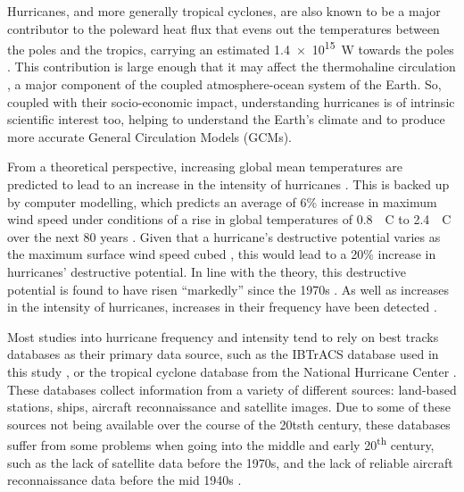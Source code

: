 \documentclass[pdftex,12pt,a4paper]{report}
\newcommand{\ts}{\textsuperscript}
\begin{document}
Hurricanes, and more generally tropical cyclones, are also known to be a major contributor to the
poleward heat flux that evens out the temperatures between the poles and the tropics, carrying an
estimated \SI{1.4e15}{W} towards the poles \parencite{emanuelContribution2001}. This
contribution is large enough that it may affect the thermohaline circulation
\parencite{hu2009effect}, a major component of the coupled atmosphere-ocean system of the Earth. So,
coupled with their socio-economic impact, understanding hurricanes is of intrinsic scientific
interest too, helping to understand the Earth's climate and to produce more accurate General
Circulation Models (GCMs).

From a theoretical perspective, increasing global mean temperatures are predicted to lead to an
increase in the intensity of hurricanes \parencite{emanuel1987dependence}. This is backed up by
computer modelling, which predicts an average of 6\% increase in maximum wind speed under conditions
of a rise in global temperatures of \SI{0.8}{\textdegree C} to \SI{2.4}{\textdegree C} over the next
80 years \parencite{knutson2004impact}. Given that a hurricane's destructive potential varies as the
maximum surface wind speed cubed \parencite{emanuel2005increasing}, this would lead to a 20\%
increase in hurricanes' destructive potential. In line with the theory, this destructive potential
is found to have risen ``markedly'' since the 1970s \parencite{emanuel2005increasing}. As well as
increases in the intensity of hurricanes, increases in their frequency have been detected
\parencite{goldenberg2001recent, webster2005changes, holland2007heightened}.

Most studies into hurricane frequency and intensity tend to rely on best tracks databases as their
primary data source, such as the IBTrACS database used in this study
\parencite{knappInternational2010}, or the tropical cyclone database from the National Hurricane
Center \parencite[HURDAT;][]{jarvinen1984tropical}. These databases collect information from a
variety of different sources: land-based stations, ships, aircraft reconnaissance and satellite
images. Due to some of these sources not being available over the course of the 20ts{th} century,
these databases suffer from some problems when going into the middle and early 20\ts{th} century,
such as the lack of satellite data before the 1970s, and the lack of reliable aircraft
reconnaissance data before the mid 1940s \parencite[see Section \ref{sec:ibtracs} for more
details]{chang2007number}. 
\end{document}
